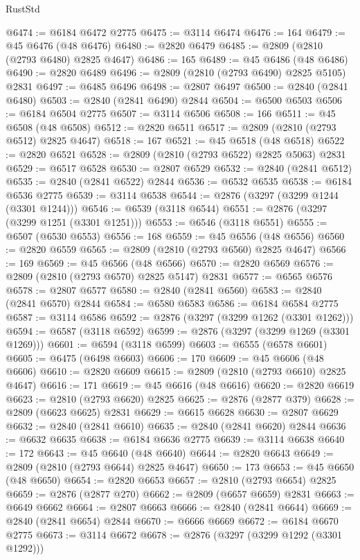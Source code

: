 \begin{lexlean}{RustStd}
\begin{coremodule}
@6474 := @6184 @6472 @2775
@6475 := @3114 @6474
@6476 := 164
@6479 := @45 @6476 (@48 @6476)
@6480 := @2820 @6479
@6485 := @2809 (@2810 (@2793 @6480) @2825 @4647)
@6486 := 165
@6489 := @45 @6486 (@48 @6486)
@6490 := @2820 @6489
@6496 := @2809 (@2810 (@2793 @6490) @2825 @5105) @2831
@6497 := @6485 @6496
@6498 := @2807 @6497
@6500 := @2840 (@2841 @6480)
@6503 := @2840 (@2841 @6490) @2844
@6504 := @6500 @6503
@6506 := @6184 @6504 @2775
@6507 := @3114 @6506
@6508 := 166
@6511 := @45 @6508 (@48 @6508)
@6512 := @2820 @6511
@6517 := @2809 (@2810 (@2793 @6512) @2825 @4647)
@6518 := 167
@6521 := @45 @6518 (@48 @6518)
@6522 := @2820 @6521
@6528 := @2809 (@2810 (@2793 @6522) @2825 @5063) @2831
@6529 := @6517 @6528
@6530 := @2807 @6529
@6532 := @2840 (@2841 @6512)
@6535 := @2840 (@2841 @6522) @2844
@6536 := @6532 @6535
@6538 := @6184 @6536 @2775
@6539 := @3114 @6538
@6544 := @2876 (@3297 (@3299 @1244 (@3301 @1244)))
@6546 := @6539 (@3118 @6544)
@6551 := @2876 (@3297 (@3299 @1251 (@3301 @1251)))
@6553 := @6546 (@3118 @6551)
@6555 := @6507 (@6530 @6553)
@6556 := 168
@6559 := @45 @6556 (@48 @6556)
@6560 := @2820 @6559
@6565 := @2809 (@2810 (@2793 @6560) @2825 @4647)
@6566 := 169
@6569 := @45 @6566 (@48 @6566)
@6570 := @2820 @6569
@6576 := @2809 (@2810 (@2793 @6570) @2825 @5147) @2831
@6577 := @6565 @6576
@6578 := @2807 @6577
@6580 := @2840 (@2841 @6560)
@6583 := @2840 (@2841 @6570) @2844
@6584 := @6580 @6583
@6586 := @6184 @6584 @2775
@6587 := @3114 @6586
@6592 := @2876 (@3297 (@3299 @1262 (@3301 @1262)))
@6594 := @6587 (@3118 @6592)
@6599 := @2876 (@3297 (@3299 @1269 (@3301 @1269)))
@6601 := @6594 (@3118 @6599)
@6603 := @6555 (@6578 @6601)
@6605 := @6475 (@6498 @6603)
@6606 := 170
@6609 := @45 @6606 (@48 @6606)
@6610 := @2820 @6609
@6615 := @2809 (@2810 (@2793 @6610) @2825 @4647)
@6616 := 171
@6619 := @45 @6616 (@48 @6616)
@6620 := @2820 @6619
@6623 := @2810 (@2793 @6620) @2825
@6625 := @2876 (@2877 @379)
@6628 := @2809 (@6623 @6625) @2831
@6629 := @6615 @6628
@6630 := @2807 @6629
@6632 := @2840 (@2841 @6610)
@6635 := @2840 (@2841 @6620) @2844
@6636 := @6632 @6635
@6638 := @6184 @6636 @2775
@6639 := @3114 @6638
@6640 := 172
@6643 := @45 @6640 (@48 @6640)
@6644 := @2820 @6643
@6649 := @2809 (@2810 (@2793 @6644) @2825 @4647)
@6650 := 173
@6653 := @45 @6650 (@48 @6650)
@6654 := @2820 @6653
@6657 := @2810 (@2793 @6654) @2825
@6659 := @2876 (@2877 @270)
@6662 := @2809 (@6657 @6659) @2831
@6663 := @6649 @6662
@6664 := @2807 @6663
@6666 := @2840 (@2841 @6644)
@6669 := @2840 (@2841 @6654) @2844
@6670 := @6666 @6669
@6672 := @6184 @6670 @2775
@6673 := @3114 @6672
@6678 := @2876 (@3297 (@3299 @1292 (@3301 @1292)))

\end{coremodule}
\end{lexlean}
